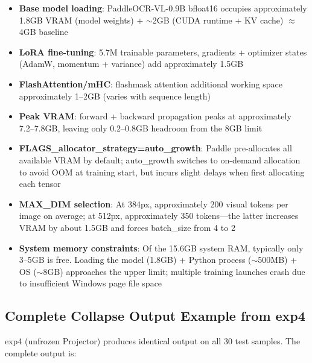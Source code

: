 \begin{itemize}[nosep]
    \item \textbf{Base model loading}: PaddleOCR-VL-0.9B bfloat16 occupies approximately 1.8GB VRAM (model weights) + $\sim$2GB (CUDA runtime + KV cache) $\approx$ 4GB baseline
    \item \textbf{LoRA fine-tuning}: 5.7M trainable parameters, gradients + optimizer states (AdamW, momentum + variance) add approximately 1.5GB
    \item \textbf{FlashAttention/mHC}: flashmask attention additional working space approximately 1--2GB (varies with sequence length)
    \item \textbf{Peak VRAM}: forward + backward propagation peaks at approximately 7.2--7.8GB, leaving only 0.2--0.8GB headroom from the 8GB limit
    \item \textbf{FLAGS\_allocator\_strategy=auto\_growth}: Paddle pre-allocates all available VRAM by default; auto\_growth switches to on-demand allocation to avoid OOM at training start, but incurs slight delays when first allocating each tensor
    \item \textbf{MAX\_DIM selection}: At 384px, approximately 200 visual tokens per image on average; at 512px, approximately 350 tokens---the latter increases VRAM by about 1.5GB and forces batch\_size from 4 to 2
    \item \textbf{System memory constraints}: Of the 15.6GB system RAM, typically only 3--5GB is free. Loading the model (1.8GB) + Python process ($\sim$500MB) + OS ($\sim$8GB) approaches the upper limit; multiple training launches crash due to insufficient Windows page file space
\end{itemize}

\subsection{Complete Collapse Output Example from exp4}

exp4 (unfrozen Projector) produces identical output on all 30 test samples. The complete output is:

